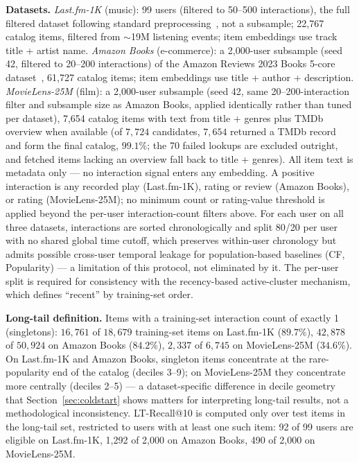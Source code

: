 \documentclass{article}
\begin{document}
\textbf{Datasets.} \emph{Last.fm-1K} (music): 99 users (filtered to 50--500 interactions), the full filtered dataset following standard preprocessing~\cite{celma2010}, not a subsample; 22{,}767 catalog items, filtered from $\sim$19M listening events; item embeddings use track title + artist name. \emph{Amazon Books} (e-commerce): a 2{,}000-user subsample (seed 42, filtered to 20--200 interactions) of the Amazon Reviews 2023 Books 5-core dataset~\cite{hou2024}, 61{,}727 catalog items; item embeddings use title + author + description. \emph{MovieLens-25M} (film): a 2{,}000-user subsample (seed 42, same 20--200-interaction filter and subsample size as Amazon Books, applied identically rather than tuned per dataset), 7{,}654 catalog items with text from title + genres plus TMDb overview when available (of $7{,}724$ candidates, $7{,}654$ returned a TMDb record and form the final catalog, $99.1\%$; the 70 failed lookups are excluded outright, and fetched items lacking an overview fall back to title + genres). All item text is metadata only --- no interaction signal enters any embedding. A positive interaction is any recorded play (Last.fm-1K), rating or review (Amazon Books), or rating (MovieLens-25M); no minimum count or rating-value threshold is applied beyond the per-user interaction-count filters above. For each user on all three datasets, interactions are sorted chronologically and split 80/20 per user with no shared global time cutoff, which preserves within-user chronology but admits possible cross-user temporal leakage for population-based baselines (CF, Popularity) --- a limitation of this protocol, not eliminated by it. The per-user split is required for consistency with the recency-based active-cluster mechanism, which defines ``recent'' by training-set order.

\textbf{Long-tail definition.} Items with a training-set interaction count of exactly 1 (singletons): $16{,}761$ of $18{,}679$ training-set items on Last.fm-1K ($89.7\%$), $42{,}878$ of $50{,}924$ on Amazon Books ($84.2\%$), $2{,}337$ of $6{,}745$ on MovieLens-25M ($34.6\%$). On Last.fm-1K and Amazon Books, singleton items concentrate at the rare-popularity end of the catalog (deciles 3--9); on MovieLens-25M they concentrate more centrally (deciles 2--5) --- a dataset-specific difference in decile geometry that Section~\ref{sec:coldstart} shows matters for interpreting long-tail results, not a methodological inconsistency. LT-Recall@10 is computed only over test items in the long-tail set, restricted to users with at least one such item: 92 of 99 users are eligible on Last.fm-1K, 1{,}292 of 2{,}000 on Amazon Books, 490 of 2{,}000 on MovieLens-25M.
\end{document}
